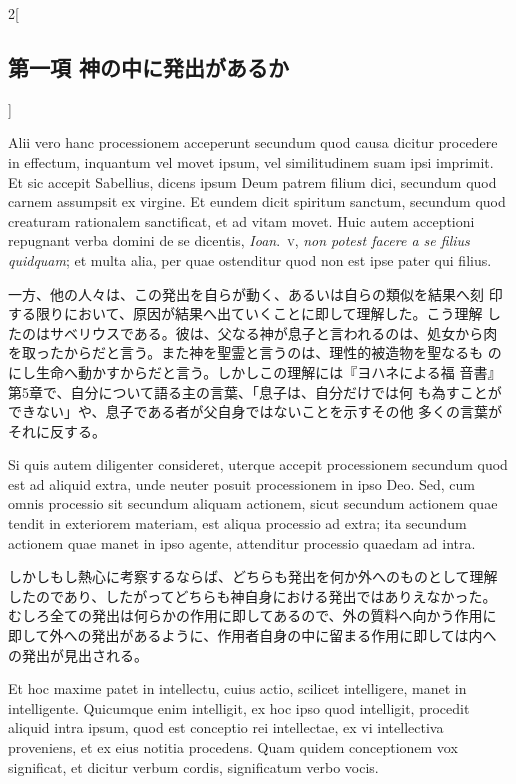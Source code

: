 \documentclass[paper=a4paper,fontsize=10pt,jafontsize=9pt,titlepage]{jlreq}
\begin{document}
\begin{paracol}{2}[\subsection{第一項 神の中に発出があるか}]
\switchcolumn*


Alii vero hanc processionem acceperunt secundum
quod causa dicitur procedere in effectum, inquantum vel movet ipsum, vel
similitudinem suam ipsi imprimit. Et sic accepit Sabellius, dicens ipsum
Deum patrem filium dici, secundum quod carnem assumpsit ex virgine. Et
eundem dicit spiritum sanctum, secundum quod creaturam rationalem
sanctificat, et ad vitam movet. Huic autem acceptioni repugnant verba
domini de se dicentis, {\itshape Ioan}.~{\scshape v}, {\itshape non potest facere a se filius quidquam};
et multa alia, per quae ostenditur quod non est ipse pater qui
filius.


\switchcolumn


一方、他の人々は、この発出を自らが動く、あるいは自らの類似を結果へ刻
 印する限りにおいて、原因が結果へ出ていくことに即して理解した。こう理解
 したのはサベリウスである。彼は、父なる神が息子と言われるのは、処女から肉
 を取ったからだと言う。また神を聖霊と言うのは、理性的被造物を聖なるも
 のにし生命へ動かすからだと言う。しかしこの理解には『ヨハネによる福
 音書』第5章で、自分について語る主の言葉、「息子は、自分だけでは何
 も為すことができない」や、息子である者が父自身ではないことを示すその他
 多くの言葉がそれに反する。


\switchcolumn*


Si quis autem diligenter consideret, uterque accepit
processionem secundum quod est ad aliquid extra, unde neuter posuit
processionem in ipso Deo. Sed, cum omnis processio sit secundum aliquam
actionem, sicut secundum actionem quae tendit in exteriorem materiam,
est aliqua processio ad extra; ita secundum actionem quae manet in ipso
agente, attenditur processio quaedam ad intra.


\switchcolumn


しかしもし熱心に考察するならば、どちらも発出を何か外へのものとして理解
 したのであり、したがってどちらも神自身における発出ではありえなかった。
むしろ全ての発出は何らかの作用に即してあるので、外の質料へ向かう作用に
 即して外への発出があるように、作用者自身の中に留まる作用に即しては内へ
 の発出が見出される。


\switchcolumn*


Et hoc maxime patet in
intellectu, cuius actio, scilicet intelligere, manet in
intelligente. Quicumque enim intelligit, ex hoc ipso quod intelligit,
procedit aliquid intra ipsum, quod est conceptio rei intellectae, ex vi
intellectiva proveniens, et ex eius notitia procedens. Quam quidem
conceptionem vox significat, et dicitur verbum cordis, significatum
verbo vocis.



\end{paracol}
\end{document}
